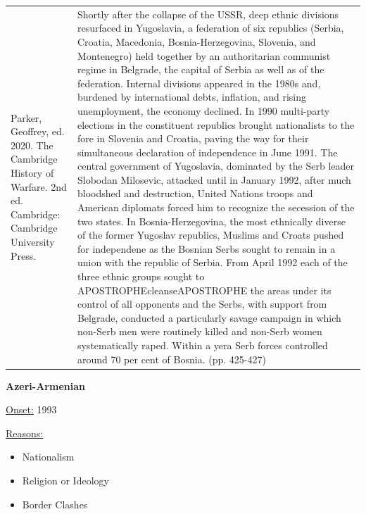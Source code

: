 {\begin{longtable}{p{}p{}}
Parker, Geoffrey, ed. 2020. The Cambridge History of Warfare. 2nd ed. Cambridge: Cambridge University Press. & Shortly after the collapse of the USSR, deep ethnic divisions resurfaced in Yugoslavia, a federation of six republics (Serbia, Croatia, Macedonia, Bosnia-Herzegovina, Slovenia, and Montenegro) held together by an authoritarian communist regime in Belgrade, the capital of Serbia as well as of the federation. Internal divisions appeared in the 1980s and, burdened by international debts, inflation,  and rising unemployment, the economy declined. In 1990 multi-party elections in the constituent republics brought nationalists to the fore in Slovenia and Croatia, paving the way for their simultaneous declaration of independence in June 1991. The central government of Yugoslavia, dominated by the Serb leader Slobodan Milosevic, attacked until in January 1992, after much bloodshed and destruction, United Nations troops and American diplomats forced him to recognize the secession of the two states. In Bosnia-Herzegovina, the most ethnically diverse of the former Yugoslav republics, Muslims and Croats pushed for independene as the Bosnian Serbs sought to remain in a union with the republic of Serbia. From April 1992 each of the three ethnic groups sought to APOSTROPHEcleanseAPOSTROPHE the areas under its control of all opponents and the Serbs, with support from Belgrade, conducted a particularly savage campaign in which non-Serb men were routinely killed and non-Serb women systematically raped. Within a yera Serb forces controlled around 70 per cent of Bosnia.  (pp. 425-427)
\\
\end{longtable}}
\clearpage
         \textbf{Azeri-Armenian} 

          \underline{Onset:} 1993         

\underline{Reasons:}
\begin{itemize}
\item Nationalism
\item Religion or Ideology
\item Border Clashes
\end{itemize}

